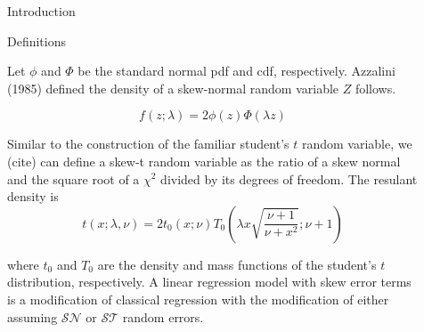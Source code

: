 \documentclass[final]{beamer}
\newlength{\sepwid}
\newlength{\onecolwid}
\newlength{\twocolwid}
\begin{document}
\begin{frame}[t]
\begin{columns}[t]
\begin{column}{\onecolwid}
\begin{block}{Introduction}
\end{block}


\begin{block}{Definitions}

Let $\phi$ and $\Phi$ be the standard normal pdf and cdf, respectively. Azzalini (1985) defined the density of a skew-normal random variable $Z$ follows.

$$f(z;\lambda) = 2\phi(z)\Phi(\lambda z)$$ 

Similar to the construction of the familiar student's $t$ random variable, we (cite) can define a skew-t random variable as the ratio of a skew normal and the square root of a $\chi^2$ divided by its degrees of freedom. The resulant density is
$$t(x;\lambda,\nu) = 2t_0(x;\nu)T_0(\lambda x \sqrt{\frac{\nu + 1}{\nu + x^2}};\nu + 1)$$

where $t_0$ and $T_0$ are the density and mass functions of the student's $t$ distribution, respectively. A linear regression model with skew error terms is a modification of classical regression with the modification of either assuming $\mathcal{SN}$ or $\mathcal{ST}$ random errors. 

\end{block}


\end{column} %

\begin{column}{\sepwid}\end{column} %

\begin{column}{\twocolwid} %

\begin{columns}[t,totalwidth=\twocolwid] %

\begin{column}{\onecolwid}\vspace{-.6in} %

%	


\end{column}
\end{columns}
\end{column}
\end{columns}
\end{frame}
\end{document}
